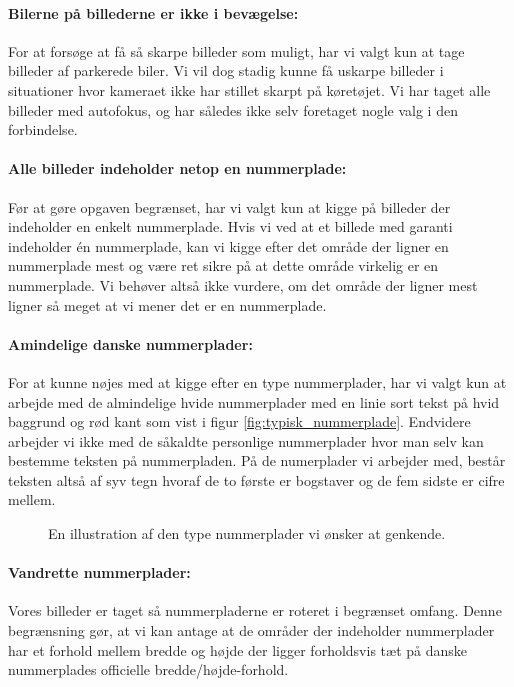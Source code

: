 \paragraph{Bilerne på billederne er ikke i bevægelse:}
For at forsøge at få så skarpe billeder som muligt, har vi valgt kun at tage billeder af parkerede biler. Vi vil dog stadig kunne få uskarpe billeder i situationer hvor kameraet ikke har stillet skarpt på køretøjet. Vi har taget alle billeder med autofokus, og har således ikke selv foretaget nogle valg i den forbindelse.

\paragraph{Alle billeder indeholder netop en nummerplade:}
Før at gøre opgaven begrænset, har vi valgt kun at kigge på billeder der indeholder en enkelt nummerplade. Hvis vi ved at et billede med garanti indeholder én nummerplade, kan vi kigge efter det område der ligner en nummerplade mest og være ret sikre på at dette område virkelig er en nummerplade. Vi behøver altså ikke vurdere, om det område der ligner mest ligner så meget at vi mener det er en nummerplade.

\paragraph{Amindelige danske nummerplader:}
For at kunne nøjes med at kigge efter en type nummerplader, har vi valgt kun at arbejde med de almindelige hvide nummerplader med en linie sort tekst på hvid baggrund og rød kant som vist i figur \vref{fig:typisk_nummerplade}. Endvidere arbejder vi ikke med de såkaldte personlige nummerplader hvor man selv kan bestemme teksten på nummerpladen. På de numerplader vi arbejder med, består teksten altså af syv tegn hvoraf de to første er bogstaver og de fem sidste er cifre mellem.

\begin{figure}[htp]
\centering
{} 
\caption{En illustration af den type nummerplader vi ønsker at genkende.}
\label{fig:typisk_nummerplade}
\end{figure}

\paragraph{Vandrette nummerplader:}
Vores billeder er taget så nummerpladerne er roteret i begrænset omfang. Denne begrænsning gør, at vi kan antage at de områder der indeholder nummerplader har et forhold mellem bredde og højde der ligger forholdsvis tæt på danske nummerplades officielle bredde/højde-forhold.

